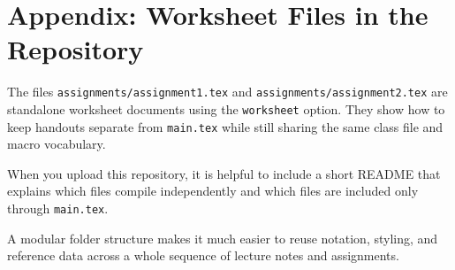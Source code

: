 \chapter{Appendix: Worksheet Files in the Repository}

The files \texttt{assignments/assignment1.tex} and \texttt{assignments/assignment2.tex} are standalone
worksheet documents using the \texttt{worksheet} option. They show how to keep handouts separate from
\texttt{main.tex} while still sharing the same class file and macro vocabulary.

\begin{warning}
When you upload this repository, it is helpful to include a short README that explains which files compile
independently and which files are included only through \texttt{main.tex}.
\end{warning}

\begin{digression}
A modular folder structure makes it much easier to reuse notation, styling, and reference data across a
whole sequence of lecture notes and assignments.
\end{digression}
